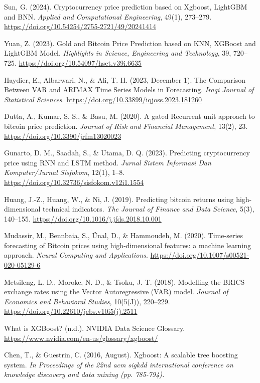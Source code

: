 \documentclass{ieeeojies}
\begin{document}
\begin{thebibliography}{00}
     Sun, G. (2024). Cryptocurrency price prediction based on Xgboost, LightGBM and BNN. \textit{Applied and Computational Engineering}, 49(1), 273–279. \url{https://doi.org/10.54254/2755-2721/49/20241414}

     Yuan, Z. (2023). Gold and Bitcoin Price Prediction based on KNN, XGBoost and LightGBM Model. \textit{Highlights in Science, Engineering and Technology}, 39, 720–725. \url{https://doi.org/10.54097/hset.v39i.6635}

     Haydier, E., Albarwari, N., \& Ali, T. H. (2023, December 1). The Comparison Between VAR and ARIMAX Time Series Models in Forecasting. \textit{Iraqi Journal of Statistical Sciences}. \url{https://doi.org/10.33899/iqjoss.2023.181260}

     Dutta, A., Kumar, S. S., \& Basu, M. (2020). A gated Recurrent unit approach to bitcoin price prediction. \textit{Journal of Risk and Financial Management}, 13(2), 23. \url{https://doi.org/10.3390/jrfm13020023}

     Gunarto, D. M., Saadah, S., \& Utama, D. Q. (2023). Predicting cryptocurrency price using RNN and LSTM method. \textit{Jurnal Sistem Informasi Dan Komputer/Jurnal Sisfokom}, 12(1), 1–8. \url{https://doi.org/10.32736/sisfokom.v12i1.1554}

     Huang, J.-Z., Huang, W., \& Ni, J. (2019). Predicting bitcoin returns using high-dimensional technical indicators. \textit{The Journal of Finance and Data Science}, 5(3), 140–155. \url{https://doi.org/10.1016/j.jfds.2018.10.001}

     Mudassir, M., Bennbaia, S., Ünal, D., \& Hammoudeh, M. (2020). Time-series forecasting of Bitcoin prices using high-dimensional features: a machine learning approach. \textit{Neural Computing and Applications}. \url{https://doi.org/10.1007/s00521-020-05129-6}

     Metsileng, L. D., Moroke, N. D., \& Tsoku, J. T. (2018). Modelling the BRICS exchange rates using the Vector Autoregressive (VAR) model. \textit{Journal of Economics and Behavioral Studies}, 10(5(J)), 220–229. \url{https://doi.org/10.22610/jebs.v10i5(j).2511}

     What is XGBoost? (n.d.). NVIDIA Data Science Glossary. \url{https://www.nvidia.com/en-us/glossary/xgboost/}

     Chen, T., \& Guestrin, C. (2016, August). Xgboost: A scalable tree boosting system. \textit{In Proceedings of the 22nd acm sigkdd international conference on knowledge discovery and data mining (pp. 785-794).} 

\end{thebibliography}

\EOD
\end{document}
